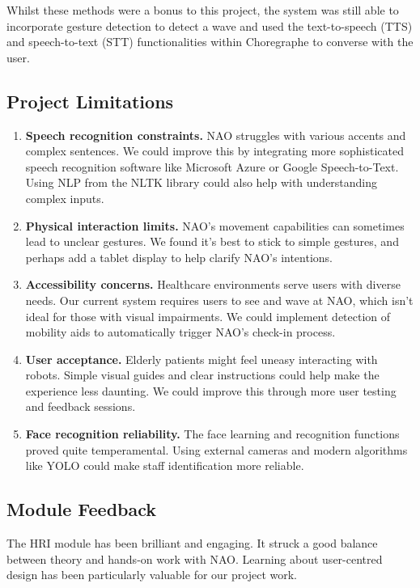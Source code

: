 \documentclass[conference]{IEEEtran}
\begin{document}
Whilst these methods were a bonus to this project, the system was still able to incorporate gesture detection to detect a wave and used the text-to-speech (TTS) and speech-to-text (STT) functionalities within Choregraphe to converse with the user. 



\subsection{Project Limitations}

\begin{enumerate} 
        \item \textbf{Speech recognition constraints.} NAO struggles with various accents and complex sentences. We could improve this by integrating more sophisticated speech recognition software like Microsoft Azure or Google Speech-to-Text. Using NLP from the NLTK library could also help with understanding complex inputs.
        
        \item \textbf{Physical interaction limits.} NAO's movement capabilities can sometimes lead to unclear gestures. We found it's best to stick to simple gestures, and perhaps add a tablet display to help clarify NAO's intentions.
        
        \item \textbf{Accessibility concerns.} Healthcare environments serve users with diverse needs. Our current system requires users to see and wave at NAO, which isn't ideal for those with visual impairments. We could implement detection of mobility aids to automatically trigger NAO's check-in process.
        
        \item \textbf{User acceptance.} Elderly patients might feel uneasy interacting with robots. Simple visual guides and clear instructions could help make the experience less daunting. We could improve this through more user testing and feedback sessions.
        
        \item \textbf{Face recognition reliability.} The face learning and recognition functions proved quite temperamental. Using external cameras and modern algorithms like YOLO could make staff identification more reliable.
\end{enumerate}

\subsection{Module Feedback} The HRI module has been brilliant and engaging. It struck a good balance between theory and hands-on work with NAO. Learning about user-centred design has been particularly valuable for our project work.
\end{document}
